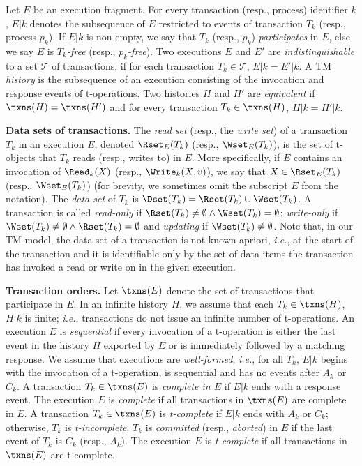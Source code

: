 Let $E$ be an execution fragment.
For every transaction (resp., process) identifier $k$,
$E|k$ denotes the subsequence of $E$ restricted to events of
transaction $T_k$ (resp., process $p_k$).
If $E|k$ is non-empty,
we say that $T_k$ (resp., $p_k$) \emph{participates} in $E$, else we say $E$ is \emph{$T_k$-free} (resp., \emph{$p_k$-free}).
Two executions $E$ and $E'$ are \emph{indistinguishable} to a set $\mathcal{T}$ of transactions, if
for each transaction $T_k \in \mathcal{T}$, $E|k=E'|k$.
A TM \emph{history} is the subsequence of an execution consisting of the invocation and 
response events of t-operations.
Two histories $H$ and $H'$ are \emph{equivalent} if $\txns(H) = \txns(H')$
and for every transaction $T_k \in \txns(H)$, $H|k=H'|k$.

\vspace{1mm}\noindent\textbf{Data sets of transactions.}
The \emph{read set} (resp., the \emph{write set}) of a transaction $T_k$ in an execution $E$,
denoted $\Rset_E(T_k)$ (resp., $\Wset_E(T_k)$), is the set of t-objects that $T_k$ reads (resp., writes to) in $E$.
More specifically, if $E$ contains an invocation of $\Read_k(X)$ (resp., $\Write_k(X,v)$), we say
that $X\in \Rset_E(T_k)$ (resp., $\Wset_E(T_k)$) (for brevity, we sometimes omit the subscript $E$ from the notation).
The \emph{data set} of $T_k$ is $\Dset(T_k)=\Rset(T_k)\cup\Wset(T_k)$.
A transaction is called \emph{read-only} if $\Rset(T_k)\neq \emptyset \wedge \Wset(T_k)=\emptyset$; 
\emph{write-only} if $\Wset(T_k)\neq \emptyset \wedge \Rset(T_k)=\emptyset$ and
\emph{updating} if $\Wset(T_k)\neq\emptyset$.
Note that, in our TM model, the data set of a transaction is not known apriori, \emph{i.e.}, at the start of the transaction
and it is identifiable only by the set of data items the transaction has invoked a read or write on in the given execution.

\vspace{1mm}\noindent\textbf{Transaction orders.}
Let $\txns(E)$ denote the set of transactions that participate in $E$.
In an infinite history $H$, 
we assume that each $T_k\in \txns(H)$, $H|k$ is finite;
\emph{i.e.}, transactions do not issue an infinite number of t-operations.
An execution $E$ is \emph{sequential} if every invocation of
a t-operation is either the last event in the history $H$ exported by $E$ or
is immediately followed by a matching response.
We assume that executions are \emph{well-formed}, \emph{i.e.}, for all $T_k$, $E|k$ begins with the invocation of a t-operation, is
sequential and has no events after $A_k$ or $C_k$.
A transaction $T_k\in \txns(E)$ is \emph{complete in $E$} if
$E|k$ ends with a response event.
The execution $E$ is \emph{complete} if all transactions in $\txns(E)$
are complete in $E$.
A transaction $T_k\in \txns(E)$ is \emph{t-complete} if $E|k$
ends with $A_k$ or $C_k$; otherwise, $T_k$ is \emph{t-incomplete}.
$T_k$ is \emph{committed} (resp., \emph{aborted}) in $E$
if the last event of $T_k$ is $C_k$ (resp., $A_k$).
The execution $E$ is \emph{t-complete} if all transactions in
$\txns(E)$ are t-complete.

